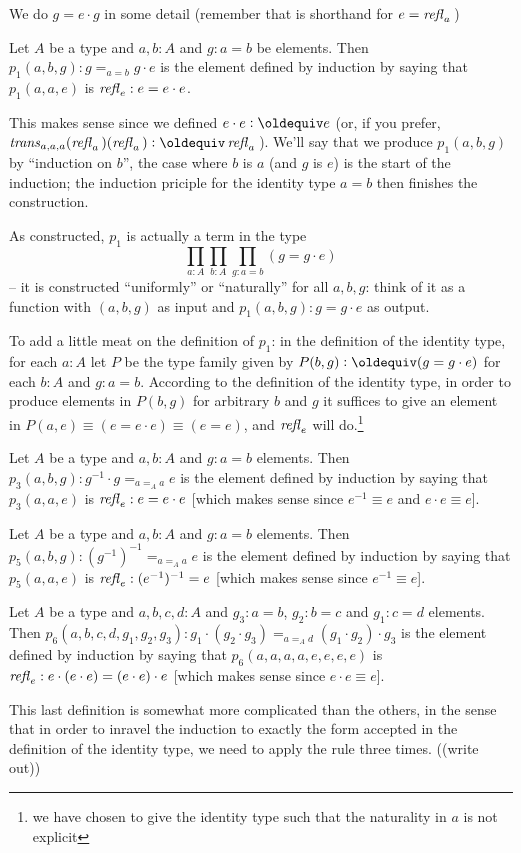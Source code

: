 We do $g=e\cdot g$ in some detail (remember that is shorthand for $e=\mathop{{\it refl}_{a}}{}$)
\begin{definition}
  Let $A$ be a type and $a, b:A$ and $g:a=b$ be elements.  Then $p_1(a,b,g):g=_{a=b}g\cdot e$ is the element defined by induction by saying that $p_1(a,a,e)$ is $\mathop{{\it refl}_{e}}:e=e\cdot e$.
\end{definition}
\begin{remark}
  This makes sense since we defined $e\cdot e\defequi e$ (or, if you prefer, $\trans_{a,a,a}(\refl a{})(\refl a{})\defequi \refl a{}$).  We'll say that we produce $p_1(a,b,g)$ by ``induction on $b$'', the case where $b$ is $a$ (and $g$ is $e$) is the start of the induction; the induction priciple for the identity type $a=b$ then finishes the construction.

As constructed, $p_1$ is actually a term in the type 
$$\prod_{a:A}\prod_{b:A}\prod_{g:a=b}(g=g\cdot e)$$ -- it is constructed ``uniformly'' or ``naturally'' for all $a,b,g$: think of it as a function with $(a,b,g)$ as input and $p_1(a,b,g):g=g\cdot e$ as output.  

To add a little meat on the definition of $p_1$: in the definition of the identity type, for each $a:A$ let $P$ be the type family given by $P(b,g)\defequi (g=g\cdot e)$ for each $b:A$ and $g:a=b$.  According to the definition of the identity type, in order to produce elements in $P(b,g)$ for arbitrary $b$ and $g$ it suffices to give an element in $P(a,e)\equiv (e=e\cdot e)\equiv (e=e)$, and $\mathop{{\it refl}_{e}}$ will do.\footnote{we have chosen to give the identity type such that the naturality in $a$ is not explicit}
\end{remark}
\begin{definition}
  Let $A$ be a type and $a,b:A$ and $g:a=b$ elements.  Then $p_3(a,b,g):g^{-1}\cdot g=_{a=_Aa} e$ is the element defined by induction by saying that $p_3(a,a,e)$ is $\mathop{{\it refl}_{e}}:e=e\cdot e$ [which makes sense since $e^{-1}\equiv e$ and $e\cdot e\equiv e$].
\end{definition}
\begin{definition}
  Let $A$ be a type and $a,b:A$ and $g:a=b$ elements.  Then $p_5(a,b,g):(g^{-1})^{-1}=_{a=_Aa} e$ is the element defined by induction by saying that $p_5(a,a,e)$ is $\mathop{{\it refl}_{e}}:(e^{-1})^{-1}=e$ [which makes sense since $e^{-1}\equiv e$].
\end{definition}
\begin{definition}
  Let $A$ be a type and $a,b,c,d:A$ and $g_3:a=b$, $g_2:b=c$ and $g_1:c=d$ elements.  Then $p_6(a,b,c,d,g_1,g_2,g_3):g_1\cdot(g_2\cdot g_3)=_{a=_Ad}(g_1\cdot g_2)\cdot g_3$ is the element defined by induction by saying that $p_6(a,a,a,a,e,e,e,e)$ is $\mathop{{\it refl}_{e}}:e\cdot(e\cdot e)=(e\cdot e)\cdot e$ [which makes sense since $e\cdot e\equiv e$].
\end{definition}
\begin{remark}
  This last definition is somewhat more complicated than the others, in the sense that in order to inravel the induction to exactly the form accepted in the definition of the identity type, we need to apply the rule three times.  ((write out))
\end{remark}

